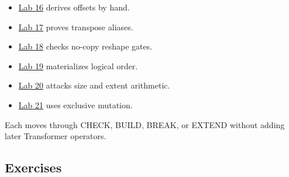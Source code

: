 \documentclass[
  10pt,
]{article}
\providecommand{\tightlist}{%
  \setlength{\itemsep}{0pt}\setlength{\parskip}{0pt}}
\begin{document}
\begin{itemize}
\tightlist
\item
  \href{https://github.com/hermonai/inside-the-llm-engine/blob/astra-visual-rewrite/labs/lab-16-offset-by-hand.md}{Lab
  16} derives offsets by hand.
\item
  \href{https://github.com/hermonai/inside-the-llm-engine/blob/astra-visual-rewrite/labs/lab-17-transpose-without-copy.md}{Lab
  17} proves transpose aliases.
\item
  \href{https://github.com/hermonai/inside-the-llm-engine/blob/astra-visual-rewrite/labs/lab-18-reshape-view.md}{Lab
  18} checks no-copy reshape gates.
\item
  \href{https://github.com/hermonai/inside-the-llm-engine/blob/astra-visual-rewrite/labs/lab-19-non-contiguous-copy.md}{Lab
  19} materializes logical order.
\item
  \href{https://github.com/hermonai/inside-the-llm-engine/blob/astra-visual-rewrite/labs/lab-20-break-shape-arithmetic.md}{Lab
  20} attacks size and extent arithmetic.
\item
  \href{https://github.com/hermonai/inside-the-llm-engine/blob/astra-visual-rewrite/labs/lab-21-mutation-and-aliasing.md}{Lab
  21} uses exclusive mutation.
\end{itemize}

Each moves through CHECK, BUILD, BREAK, or EXTEND without adding later
Transformer operators.

\subsection{Exercises}\label{exercises-4}
\end{document}
